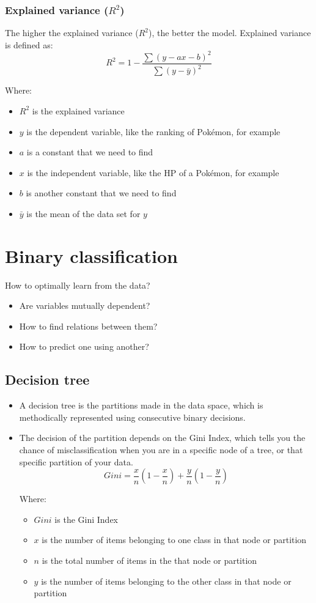 \documentclass[11pt]{article}
\begin{document}
 \newpage
\subsubsection{Explained variance (\(R^2\))}
\label{sec:org7a7dc3b}
The higher the explained variance (\(R^2\)), the better the model. Explained variance is defined as:
\[R^2 = 1 - \frac{\sum (y - ax - b)^2}{\sum(y - \bar{y})^2}\]

Where:
\begin{itemize}
\item \(R^2\) is the explained variance
\item \(y\) is the dependent variable, like the ranking of Pokémon, for example
\item \(a\) is a constant that we need to find
\item \(x\) is the independent variable, like the HP of a Pokémon, for example
\item \(b\) is another constant that we need to find
\item \(\bar{y}\) is the mean of the data set for \(y\)
\end{itemize}

 \newpage
\section{Binary classification}
\label{sec:org67e874f}
How to optimally learn from the data?
\begin{itemize}
\item Are variables mutually dependent?
\item How to find relations between them?
\item How to predict one using another?
\end{itemize}
\subsection{Decision tree}
\label{sec:orgd18d2e9}
\begin{itemize}
\item A decision tree is the partitions made in the data space, which is methodically represented using consecutive binary decisions.
\item The decision of the partition depends on the Gini Index, which tells you the chance of misclassification when you are in a specific node of a tree, or that specific partition of your data.
\[Gini = \frac{x}{n} \left(1 - \frac{x}{n} \right) + \frac{y}{n} \left(1 - \frac{y}{n} \right)\]

Where:
\begin{itemize}
\item \(Gini\) is the Gini Index
\item \(x\) is the number of items belonging to one class in that node or partition
\item \(n\) is the total number of items in the that node or partition
\item \(y\) is the number of items belonging to the other class in that node or partition
\end{itemize}
\end{itemize}
\end{document}
